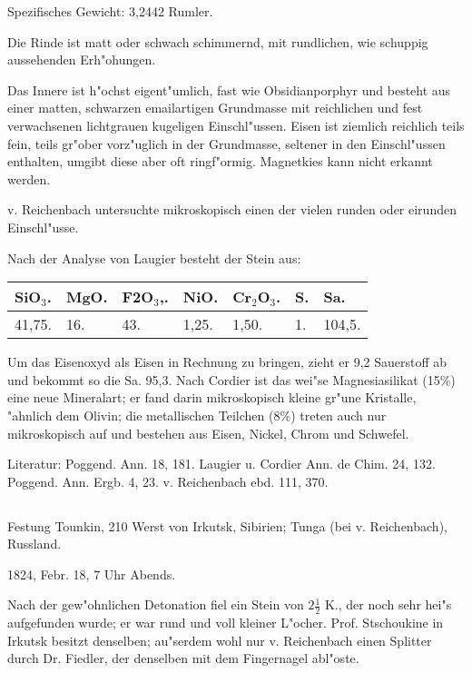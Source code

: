 \documentclass[a4paper, 11pt, oneside]{article}
\begin{document}
Spezifisches Gewicht: 3,2442 Rumler.

Die Rinde ist matt oder schwach schimmernd, mit rundlichen, wie schuppig aussehenden Erh"ohungen.

Das Innere ist h"ochst eigent"umlich, fast wie Obsidianporphyr und besteht aus einer matten, schwarzen emailartigen Grundmasse mit reichlichen und fest verwachsenen lichtgrauen kugeligen Einschl"ussen. Eisen ist ziemlich reichlich teils fein, teils gr"ober vorz"uglich in der Grundmasse, seltener in den Einschl"ussen enthalten, umgibt diese aber oft ringf"ormig. Magnetkies kann nicht erkannt werden.

v. Reichenbach untersuchte mikroskopisch einen der vielen runden oder eirunden Einschl"usse.

Nach der Analyse von Laugier besteht der Stein aus:
\begin{table}[!ht]
    \centering\swabfamily\Large
    \begin{tabular}{l l l l l l l}
        SiO$_{3}$. & MgO. & F2O$_{3}$,. & NiO. & Cr$_{2}$O$_{3}$. & S. & Sa. \\ \hline
        41,75. & 16. & 43. & 1,25. & 1,50. & 1. & 104,5. \\
    \end{tabular}
\end{table}

Um das Eisenoxyd als Eisen in Rechnung zu bringen, zieht er 9,2 Sauerstoff ab und bekommt so die Sa. 95,3. Nach Cordier ist das wei"se Magnesiasilikat (15\%) eine neue Mineralart; er fand darin mikroskopisch kleine gr"une Kristalle, "ahnlich dem Olivin; die metallischen Teilchen (8\%) treten auch nur mikroskopisch auf und bestehen aus Eisen, Nickel, Chrom und Schwefel.

\normalsize
Literatur: Poggend. Ann. 18, 181. Laugier u. Cordier Ann. de Chim. 24, 132. Poggend. Ann. Ergb. 4, 23. v. Reichenbach ebd. 111, 370.

\subsection{}
\LARGE
\paragraph{}
Festung Tounkin, 210 Werst von Irkutsk, Sibirien; Tunga (bei v. Reichenbach), Russland.

1824, Febr. 18, 7 Uhr Abends.

Nach der gew"ohnlichen Detonation fiel ein Stein von $\mathfrak{2\frac{1}{2}}$ K., der noch sehr hei"s aufgefunden wurde; er war rund und voll kleiner L"ocher. Prof. Stschoukine in Irkutsk besitzt denselben; au"serdem wohl nur v. Reichenbach einen Splitter durch Dr. Fiedler, der denselben mit dem Fingernagel abl"oste.
\end{document}
